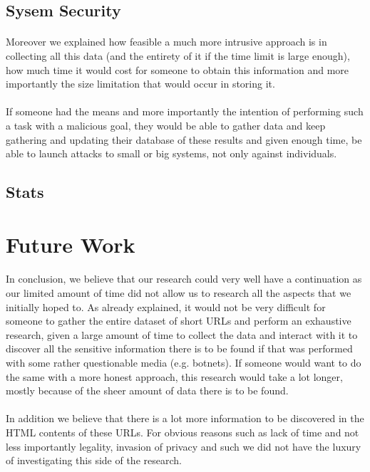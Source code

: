 \documentclass[12pt]{article}
\begin{document}
\subsection{Sysem Security}

\paragraph{}
Moreover we explained how feasible a much more intrusive approach is in collecting all this data (and the entirety of it if the time limit is large enough), how much time it would cost for someone to obtain this information and more importantly the size limitation that would occur in storing it.

\paragraph{}
If someone had the means and more importantly the intention of performing such a task with a malicious goal, they would be able to gather data and keep gathering and updating their database of these results and given enough time, be able to launch attacks to small or big systems, not only against individuals.

\subsection{Stats}
\newpage
\section{Future Work}

\paragraph{}
In conclusion, we believe that our research could very well have a continuation as our limited amount of time did not allow us to research all the aspects that we initially hoped to. As already explained, it would not be very difficult for someone to gather the entire dataset of short URLs and perform an exhaustive research, given a large amount of time to collect the data and interact with it to discover all the sensitive information there is to be found if that was performed with some rather questionable media (e.g. botnets). If someone would want to do the same with a more honest approach, this research would take a lot longer, mostly because of the sheer amount of data there is to be found.

\paragraph{}
In addition we believe that there is a lot more information to be discovered in the HTML contents of these URLs. For obvious reasons such as lack of time and not less importantly legality, invasion of privacy and such we did not have the luxury of investigating this side of the research. 
\end{document}
